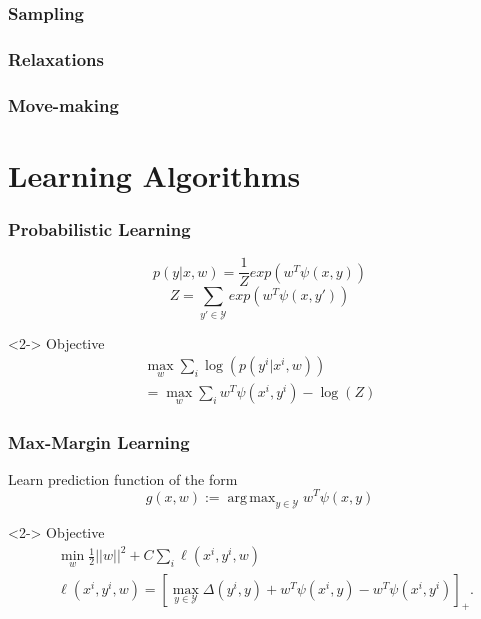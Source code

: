 \documentclass[final,ignorenonframetext,compress]{beamer}
\DeclareMathOperator*{\argmax}{arg\,max}
\newcommand{\hoch}[1]{^{#1}}
\begin{document}
\begin{frame}
    \frametitle{Sampling}
\end{frame}

\begin{frame}
    \frametitle{Relaxations}
\end{frame}

\begin{frame}
    \frametitle{Move-making}
\end{frame}

\section{Learning Algorithms}

\begin{frame}
    \frametitle{Probabilistic Learning}
    \[ p(y|x, w) = \frac{1}{Z} exp(w^T \psi(x, y))\]
    \[Z = \sum_{y' \in \mathcal{Y}} exp(w^T \psi(x, y')) \]
    \begin{visibleenv}<2->
    Objective
    \begin{align*}
        \max_w \sum_i \log(p(y\hoch{i} | x\hoch{i}, w))\\
        = \max_w \sum_i w^T \psi(x\hoch{i}, y\hoch{i}) - \log(Z)
    \end{align*}
    \end{visibleenv}
\end{frame}


\begin{frame}
    \frametitle{Max-Margin Learning}
    Learn prediction function of the form
    \[g(x, w) := \argmax_{y \in \mathcal{Y}}  w^T \psi(x, y) \]
    \begin{visibleenv}<2->
        Objective
        \begin{align*}
            &\min_w \frac{1}{2} ||w||^2 + C \sum_i  \ell(x\hoch{i}, y\hoch{i}, w)\\
            &\ell(x\hoch{i}, y\hoch{i}, w) = [\max_{y \in \mathcal{Y}} \Delta(y\hoch{i}, y) + w^T \psi(x\hoch{i}, y) - w^T \psi(x\hoch{i}, y\hoch{i})]_+.
        \end{align*}
    \cite{joachims2009cutting}
    \end{visibleenv}
\end{frame}
\end{document}
